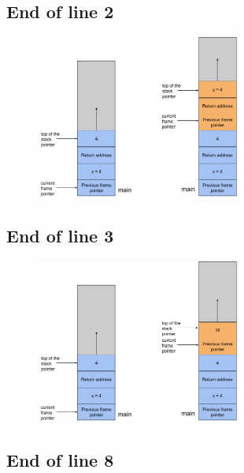 \documentclass[a4paper,11pt]{report}
\begin{document}
\FloatBarrier

\subsection*{End of line 2}

\begin{figure}[h]
  \centering
  \includegraphics[width=0.6\textwidth]{figures/ex3_schema2}
\end{figure}

\FloatBarrier

\newpage

\subsection*{End of line 3}

\begin{figure}[h]
  \centering
  \includegraphics[width=0.6\textwidth]{figures/ex3_schema3}
\end{figure}

\FloatBarrier

\subsection*{End of line 8}
\end{document}
